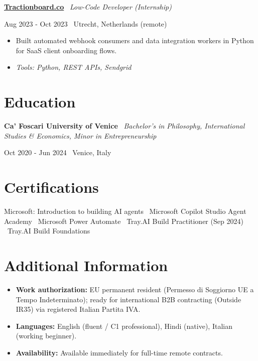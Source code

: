 \documentclass[a4paper,10pt]{article}
\newcommand{\role}[4]{%
  \vspace{2pt}\noindent
  \begin{minipage}[t]{0.70\textwidth}\raggedright\textbf{#1} \textbullet\ \textit{#3}\end{minipage}%
  \hfill
  \begin{minipage}[t]{0.28\textwidth}\raggedleft\footnotesize\color{gray}#2 \textbullet\ #4\end{minipage}%
  \vspace{1pt}%
}
\begin{document}
\role{\href{https://tractionboard.co}{Tractionboard.co}}{Aug 2023 - Oct 2023}{Low-Code Developer (Internship)}{Utrecht, Netherlands (remote)}
\begin{itemize}
  \item Built automated webhook consumers and data integration workers in Python for SaaS client onboarding flows.
  \item \textit{Tools: Python, REST APIs, Sendgrid}
\end{itemize}

\section{Education}
\role{Ca' Foscari University of Venice}{Oct 2020 - Jun 2024}{Bachelor's in Philosophy, International Studies \& Economics, Minor in Entrepreneurship}{Venice, Italy}

\section{Certifications}
Microsoft: Introduction to building AI agents \textbullet\ Microsoft Copilot Studio Agent Academy \textbullet\ Microsoft Power Automate \textbullet\ Tray.AI Build Practitioner (Sep 2024) \textbullet\ Tray.AI Build Foundations

\section{Additional Information}
\begin{itemize}
  \item \textbf{Work authorization:} EU permanent resident (Permesso di Soggiorno UE a Tempo Indeterminato); ready for international B2B contracting (Outside IR35) via registered Italian Partita IVA.
  \item \textbf{Languages:} English (fluent / C1 professional), Hindi (native), Italian (working beginner).
  \item \textbf{Availability:} Available immediately for full-time remote contracts.
\end{itemize}

\end{document}
